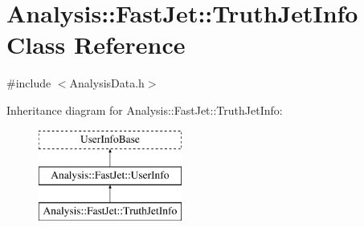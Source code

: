 \hypertarget{classAnalysis_1_1FastJet_1_1TruthJetInfo}{}\section{Analysis\+:\+:Fast\+Jet\+:\+:Truth\+Jet\+Info Class Reference}
\label{classAnalysis_1_1FastJet_1_1TruthJetInfo}


{\ttfamily \#include $<$Analysis\+Data.\+h$>$}

Inheritance diagram for Analysis\+:\+:Fast\+Jet\+:\+:Truth\+Jet\+Info\+:\begin{figure}[H]
\begin{center}
\leavevmode
\includegraphics[height=3.000000cm]{classAnalysis_1_1FastJet_1_1TruthJetInfo}
\end{center}
\end{figure}
